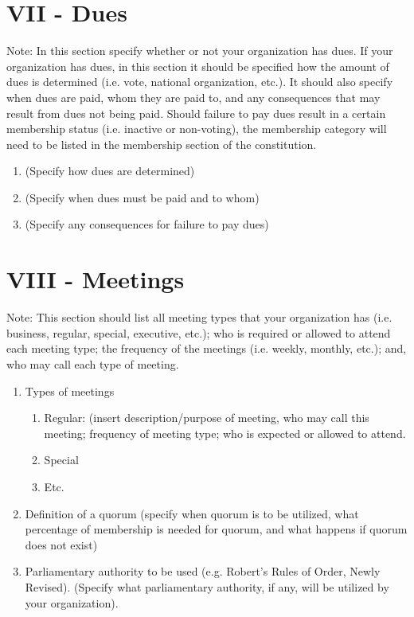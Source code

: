 \documentclass[11pt,a4paper,notitlepage]{article}
\begin{document}
\section*{VII - Dues}
Note:  In this section specify whether or not your organization has dues.  If
your organization has dues, in this section it should be specified how the
amount of dues is determined (i.e. vote, national organization, etc.).  It
should also specify when dues are paid, whom they are paid to, and any
consequences that may result from dues not being paid.  Should failure to pay
dues result in a certain membership status (i.e. inactive or non-voting), the
membership category will need to be listed in the membership section of the
constitution.
\begin{enumerate}
  \item	(Specify how dues are determined)
  \item	(Specify when dues must be paid and to whom)
  \item	(Specify any consequences for failure to pay dues)
\end{enumerate}



\section*{VIII - Meetings}
Note:  This section should list all meeting types that your organization has
(i.e. business, regular, special, executive, etc.); who is required or allowed
to attend each meeting type; the frequency of the meetings (i.e. weekly,
monthly, etc.); and, who may call each type of meeting. 
\begin{enumerate}
  \item	Types of meetings
    \begin{enumerate}
      \item	Regular:  (insert description/purpose of meeting, who may call this
      meeting; frequency of meeting type; who is expected or allowed to attend.
      \item	Special
      \item	Etc.
    \end{enumerate}
  \item	Definition of a quorum (specify when quorum is to be utilized, what
  percentage of membership is needed for quorum, and what happens if quorum does
  not exist)
  \item	Parliamentary authority to be used (e.g. Robert’s Rules of Order, Newly
  Revised).  (Specify what parliamentary authority, if any, will be utilized by
  your organization).
\end{enumerate}
\end{document}
